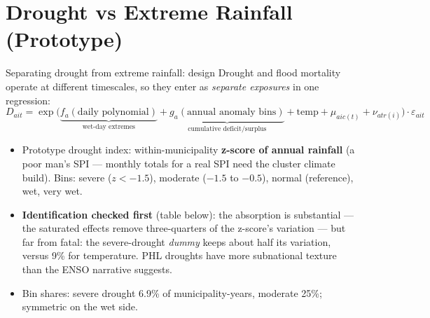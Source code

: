 \documentclass[10pt, aspectratio=169]{beamer}
\begin{document}
\section{Drought vs Extreme Rainfall (Prototype)}

\begin{frame}{Separating drought from extreme rainfall: design}
  Drought and flood mortality operate at different timescales, so they enter
  as \emph{separate exposures} in one regression:
  \[
    D_{ait} = \exp\Big( \underbrace{f_a(\text{daily polynomial})}_{\text{wet-day extremes}}
      + \underbrace{g_a(\text{annual anomaly bins})}_{\text{cumulative deficit/surplus}}
      + \text{temp} + \mu_{a i c(t)} + \nu_{a t r(i)} \Big)\cdot\varepsilon_{ait}
  \]
  \begin{itemize}
    \item Prototype drought index: within-municipality \textbf{z-score of
          annual rainfall} (a poor man's SPI --- monthly totals for a real SPI
          need the cluster climate build). Bins: severe ($z<-1.5$), moderate
          ($-1.5$ to $-0.5$), normal (reference), wet, very wet.
    \item \textbf{Identification checked first} (table below): the
          absorption is substantial --- the saturated effects remove
          three-quarters of the z-score's variation --- but far from fatal:
          the severe-drought \emph{dummy} keeps about half its variation,
          versus 9\% for temperature. PHL droughts have more subnational
          texture than the ENSO narrative suggests.
    \item Bin shares: severe drought 6.9\% of municipality-years, moderate
          25\%; symmetric on the wet side.
  \end{itemize}
  \begin{center}
    \scriptsize
    
  \end{center}
\end{frame}
\end{document}
